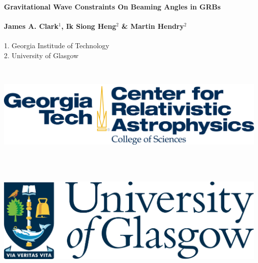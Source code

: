 \documentclass[a0,landscape]{a0poster}
\begin{document}


\begin{minipage}[b]{0.7\linewidth}
\veryHuge \color{NavyBlue} \textbf{Gravitational Wave Constraints On Beaming
    Angles in GRBs} \color{Black}\\ \\%
\huge \textbf{James A. Clark$^{1}$, Ik Siong Heng$^{2}$ \& Martin
Hendry$^{2}$}\\ \\%
\large 1. Georgia Institude of Technology\\ %
\large 2. University of Glasgow\\ %
\end{minipage}
%
\hspace{10cm}
%
\begin{minipage}[b]{0.2\linewidth}
\includegraphics[height=5cm]{cra.png} \\ \\%
\includegraphics[height=5cm]{uni_glasgow_logo.png} \\ \\%
\end{minipage}
\end{document}
